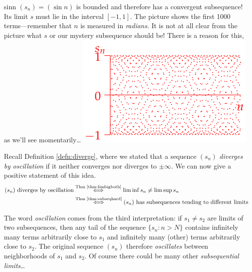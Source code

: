 \begin{example}[lower separated=false, sidebyside, sidebyside align=top seam, sidebyside gap=0pt, righthand width=0.35\linewidth]{}{sinn}
	$(s_n)=(\sin n)$ is bounded and therefore has a convergent subsequence! Its limit $s$ must lie in the interval $[-1,1]$.\smallbreak
	The picture shows the first 1000 terms---remember that $n$ is measured in \emph{radians.} It is not at all clear from the picture what $s$ or our mystery subsequence should be! There is a reason for this, as we'll see momentarily\ldots
	\tcblower
	\hfill\includegraphics[scale=1]{bwsine}
\end{example}

\goodbreak



Recall Definition \ref{defn:diverge}, where we stated that a sequence $(s_n)$ \emph{diverges by oscillation} if it neither converges nor diverges to $\pm\infty$. We can now give a positive statement of this idea.
\begin{align*}
(s_n) \text{ diverges by oscillation}&\overset{\text{Thm \ref{thm:limbigboth}}}{\iff} \liminf s_n\neq \limsup s_n\\
&\overset{\text{Thm \ref{thm:subseqhard}}}{\iff}(s_n) \text{ has subsequences tending to different limits}
\end{align*}

The word \emph{oscillation} comes from the third interpretation: if $s_1\neq s_2$ are limits of two subsequences, then any tail of the sequence $\{s_n:n>N\}$ contains infinitely many terms arbitrarily close to $s_1$ and infinitely many (other) terms arbitrarily close to $s_2$. The original sequence $(s_n)$ therefore \emph{oscillates} between neighborhoods of $s_1$ and $s_2$. Of course there could be many other \emph{subsequential limits}\ldots





